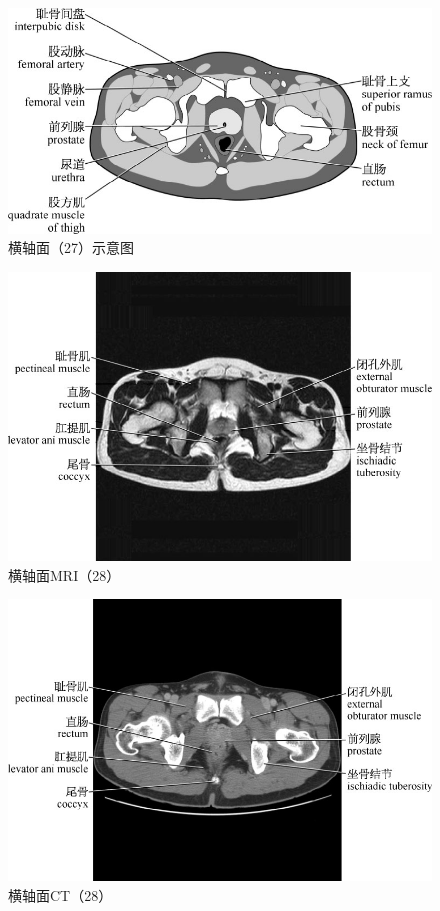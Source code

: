 \begin{figure}[!htbp]
 \centering
 \includegraphics{./images/Image00082.jpg}
 \captionsetup{justification=centering}
 \caption{横轴面（27）示意图}
  \end{figure} 
 \FloatBarrier

\begin{figure}[!htbp]
 \centering
 \includegraphics{./images/Image00083.jpg}
 \captionsetup{justification=centering}
 \caption{横轴面MRI（28）}
  \end{figure} 
 \FloatBarrier

\begin{figure}[!htbp]
 \centering
 \includegraphics{./images/Image00084.jpg}
 \captionsetup{justification=centering}
 \caption{横轴面CT（28）}
  \end{figure} 
 \FloatBarrier

